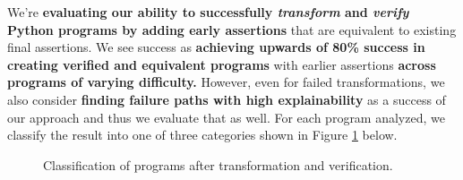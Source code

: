 \documentclass[8pt]{extarticle}
\begin{document}
We're \textbf{evaluating our ability to successfully \textit{transform} and \textit{verify} Python programs by adding early assertions} that are equivalent to existing final assertions. We see success as \textbf{achieving upwards of 80\% success in creating verified and equivalent programs} with earlier assertions \textbf{across programs of varying difficulty.} However, even for failed transformations, we also consider \textbf{finding failure paths with high explainability} as a success of our approach and thus we evaluate that as well. For each program analyzed, we classify the result into one of three categories shown in Figure \ref{fig:program-classification} below. 

\begin{figure}[H]
\centering
{}
\caption{Classification of programs after transformation and verification.}
\label{fig:program-classification}
\end{figure}
\end{document}
